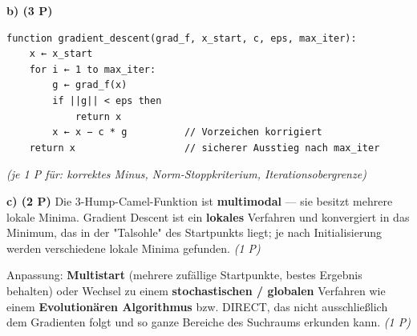 \documentclass[11pt, a4paper]{article}
\begin{document}
\textbf{b) (3 P)}

\begin{lstlisting}
function gradient_descent(grad_f, x_start, c, eps, max_iter):
    x ← x_start
    for i ← 1 to max_iter:
        g ← grad_f(x)
        if ||g|| < eps then
            return x
        x ← x − c * g          // Vorzeichen korrigiert
    return x                   // sicherer Ausstieg nach max_iter
\end{lstlisting}

\textit{(je 1 P für: korrektes Minus, Norm-Stoppkriterium, Iterationsobergrenze)}


\textbf{c) (2 P)} Die 3-Hump-Camel-Funktion ist \textbf{multimodal} — sie besitzt mehrere lokale Minima. Gradient Descent ist ein \textbf{lokales} Verfahren und konvergiert in das Minimum, das in der "Talsohle" des Startpunkts liegt; je nach Initialisierung werden verschiedene lokale Minima gefunden. \textit{(1 P)}


Anpassung: \textbf{Multistart} (mehrere zufällige Startpunkte, bestes Ergebnis behalten) oder Wechsel zu einem \textbf{stochastischen / globalen} Verfahren wie einem \textbf{Evolutionären Algorithmus} bzw. DIRECT, das nicht ausschließlich dem Gradienten folgt und so ganze Bereiche des Suchraums erkunden kann. \textit{(1 P)}





\end{document}
